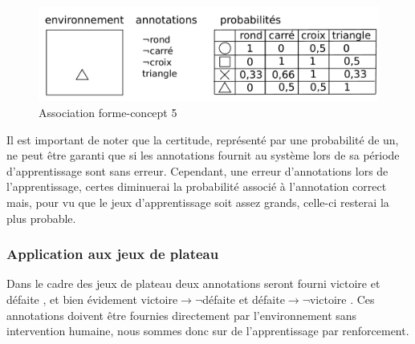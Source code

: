 \begin{figure}[H] 
\includegraphics[width=\textwidth]{files/raisonneur/annotations_5} 
\caption{Association forme-concept 5} 
\label{img_annotations_5}
\end{figure}

Il est important de noter que la certitude, représenté par une probabilité de un, ne peut être garanti que si les annotations fournit au système lors de sa période d'apprentissage sont sans erreur. Cependant, une erreur d'annotations lors de l'apprentissage, certes diminuerai la probabilité associé à l'annotation correct mais, pour vu que le jeux d'apprentissage soit assez grands, celle-ci resterai la plus probable.

\subsubsection{Application aux jeux de plateau}

Dans le cadre des jeux de plateau deux annotations seront fourni \og victoire \fg{} et \og défaite \fg{}, et bien évidement \og victoire$\rightarrow{}\neg{}$défaite \fg{} et \og défaite$\rightarrow{}\neg{}$victoire \fg{}. Ces annotations doivent être fournies directement par l'environnement sans intervention humaine, nous sommes donc sur de l'apprentissage par renforcement.
